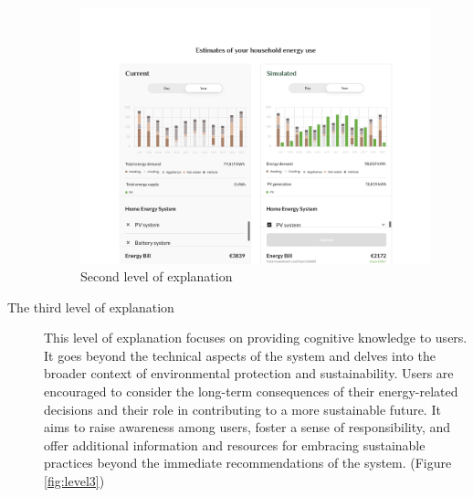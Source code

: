 \begin{description}
    \begin{figure}[h]
      \centering
      \includegraphics[width=\textwidth]{Images/level2.png}
      \caption{Second level of explanation}
      \label{fig:level2}
    \end{figure}
  \item[The third level of explanation] This level of explanation focuses on providing cognitive knowledge to users. 
    It goes beyond the technical aspects of the system and delves into the broader context of environmental protection and sustainability. 
    Users are encouraged to consider the long-term consequences of their energy-related decisions and their role in contributing to a more sustainable future. 
    It aims to raise awareness among users, foster a sense of responsibility, and offer additional information and resources for embracing sustainable practices beyond the immediate recommendations of the system. (Figure \ref{fig:level3})
    \begin{figure}[h!]
      \centering

\end{figure}
\end{description}
